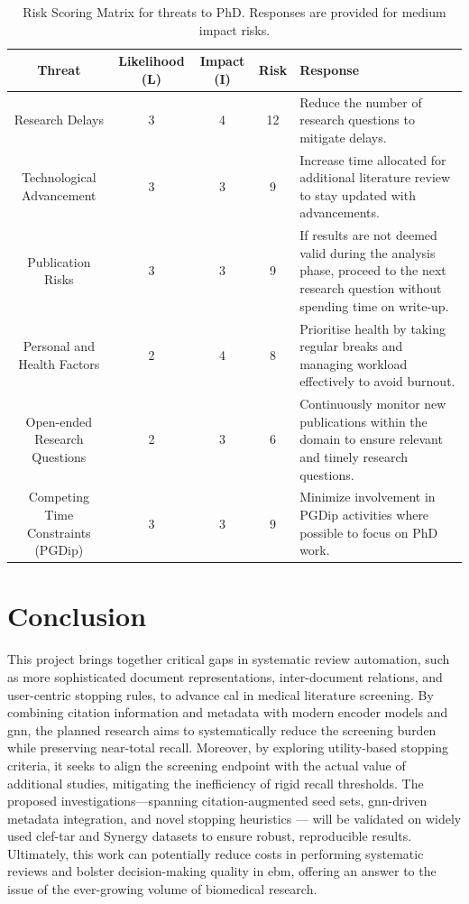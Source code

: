 \documentclass[10pt,oneside]{book}
\begin{document}
\begin{landscape}
\begin{table}[t]
\centering
\footnotesize
\begin{tabular}{|c|c|c|c|>{\raggedright\arraybackslash}p{10cm}|}
\hline
\textbf{Threat} & \textbf{Likelihood (L)} & \textbf{Impact (I)} & \textbf{Risk} & \textbf{Response} \\
\hline
Research Delays & 3 & 4 & 12 & Reduce the number of research questions to mitigate delays. \\
\hline
Technological Advancement & 3 & 3 & 9 & Increase time allocated for additional literature review to stay updated with advancements. \\
\hline
Publication Risks & 3 & 3 & 9 & If results are not deemed valid during the analysis phase, proceed to the next research question without spending time on write-up. \\
\hline
Personal and Health Factors & 2 & 4& 8  & Prioritise health by taking regular breaks and managing workload effectively to avoid burnout. \\
\hline
Open-ended Research Questions & 2 & 3 & 6 & Continuously monitor new publications within the domain to ensure relevant and timely research questions. \\
\hline
Competing Time Constraints (PGDip) & 3 & 3 & 9 & Minimize involvement in PGDip activities where possible to focus on PhD work. \\
\hline
\end{tabular}
\caption{Risk Scoring Matrix for threats to PhD. Responses are provided for medium impact risks.}
\label{tab:risk_matrix}
\end{table}
\end{landscape}

\section{Conclusion}

 This project brings together critical gaps in systematic review automation, such as more sophisticated document representations, inter-document relations, and user-centric stopping rules, to advance \gls*{cal} in medical literature screening. By combining citation information and metadata with modern encoder models and \gls*{gnn}, the planned research aims to systematically reduce the screening burden while preserving near-total recall. Moreover, by exploring utility-based stopping criteria, it seeks to align the screening endpoint with the actual value of additional studies, mitigating the inefficiency of rigid recall thresholds. The proposed investigations—spanning citation-augmented seed sets, \gls*{gnn}-driven metadata integration, and novel stopping heuristics — will be validated on widely used \gls*{clef}-\gls*{tar} and Synergy datasets to ensure robust, reproducible results. Ultimately, this work can potentially reduce costs in performing systematic reviews and bolster decision-making quality in \gls*{ebm}, offering an answer to the issue of the ever-growing volume of biomedical research.
\end{document}
